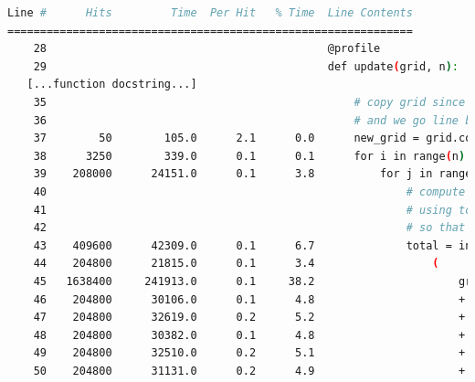 \documentclass[a4paper,12pt]{article}
\begin{document}
\begin{lstlisting}[language=bash,basicstyle=\tiny\ttfamily]
Line #      Hits         Time  Per Hit   % Time  Line Contents
==============================================================
    28                                           @profile                                                                                   
    29                                           def update(grid, n):                                                                       
   [...function docstring...]
    35                                               # copy grid since we require 8 neighbors for calculation                               
    36                                               # and we go line by line                                                               
    37        50        105.0      2.1      0.0      new_grid = grid.copy()                                                                 
    38      3250        339.0      0.1      0.1      for i in range(n):                                                                     
    39    208000      24151.0      0.1      3.8          for j in range(n):                                                                 
    40                                                       # compute 8-neghbor sum                                                        
    41                                                       # using toroidal boundary conditions - x and y wrap around                     
    42                                                       # so that the simulaton takes place on a toroidal surface.                     
    43    409600      42309.0      0.1      6.7              total = int(                                                                   
    44    204800      21815.0      0.1      3.4                  (                                                                          
    45   1638400     241913.0      0.1     38.2                      grid[i, (j - 1) % n]                                                   
    46    204800      30106.0      0.1      4.8                      + grid[i, (j + 1) % n]                                                 
    47    204800      32619.0      0.2      5.2                      + grid[(i - 1) % n, j]                                                 
    48    204800      30382.0      0.1      4.8                      + grid[(i + 1) % n, j]                                                 
    49    204800      32510.0      0.2      5.1                      + grid[(i - 1) % n, (j - 1) % n]                                       
    50    204800      31131.0      0.2      4.9                      + grid[(i - 1) % n, (j + 1) % n]                                       

\end{lstlisting}
\end{document}
